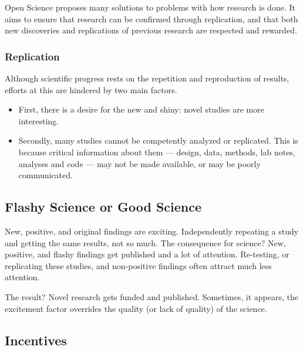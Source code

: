 \documentclass[
]{book}
\providecommand{\tightlist}{%
  \setlength{\itemsep}{0pt}\setlength{\parskip}{0pt}}
\begin{document}
Open Science proposes many solutions to problems with how research is done. It aims to ensure that research can be confirmed through replication, and that both new discoveries and replications of previous research are respected and rewarded.

\hypertarget{replication}{%
\subsubsection*{Replication}\label{replication}}

Although scientific progress rests on the repetition and reproduction of results, efforts at this are hindered by two main factors.

\begin{itemize}
\tightlist
\item
  First, there is a desire for the new and shiny: novel studies are more interesting.
\item
  Secondly, many studies cannot be competently analyzed or replicated. This is because critical information about them --- design, data, methods, lab notes, analyses and code --- may not be made available, or may be poorly communicated.
\end{itemize}

\hypertarget{flashy-science-or-good-science}{%
\subsection*{Flashy Science or Good Science}\label{flashy-science-or-good-science}}

New, positive, and original findings are exciting. Independently repeating a study and getting the same results, not so much. The consequence for science? New, positive, and flashy findings get published and a lot of attention. Re-testing, or replicating these studies, and non-positive findings often attract much less attention.

The result? Novel research gets funded and published. Sometimes, it appears, the excitement factor overrides the quality (or lack of quality) of the science.

\hypertarget{incentives}{%
\subsection*{Incentives}\label{incentives}}
\end{document}
